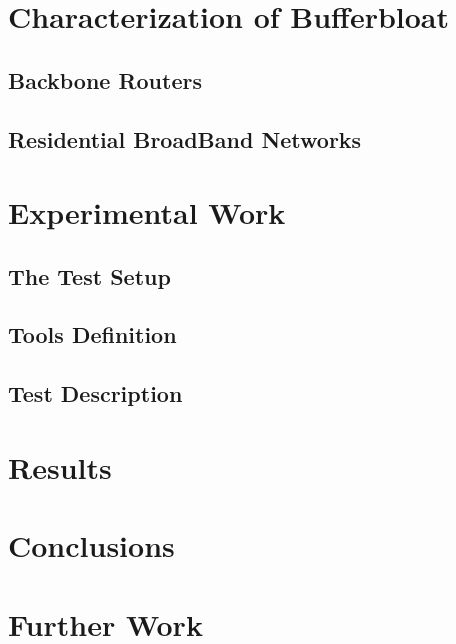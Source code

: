 \documentclass[letter, 11pt]{article}
\begin{document}
\section{Characterization of Bufferbloat}

\subsection{Backbone Routers}


\subsection{Residential BroadBand Networks}


\newpage

\section{Experimental Work}


\subsection{The Test Setup}


\subsection{Tools Definition}


\subsection{Test Description}


\section{Results}

\section{Conclusions}

\section{Further Work}

{}
\end{document}
